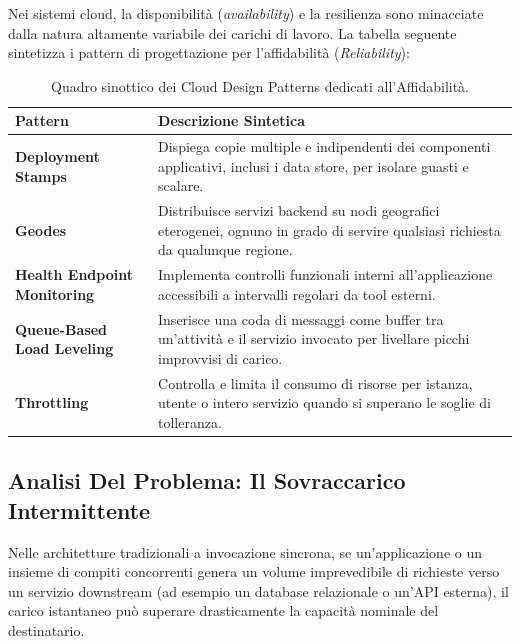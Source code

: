 \documentclass[11pt, a4paper]{article}
\begin{document}
Nei sistemi cloud, la disponibilità (\emph{availability}) e la resilienza sono minacciate dalla natura altamente variabile dei carichi di lavoro. La tabella seguente sintetizza i pattern di progettazione per l'affidabilità (\emph{Reliability}):

\begin{table}[H]
\centering
\small
\begin{tabularx}{\textwidth}{lX}
\toprule
\textbf{Pattern} & \textbf{Descrizione Sintetica} \\
\midrule
\textbf{Deployment Stamps} & Dispiega copie multiple e indipendenti dei componenti applicativi, inclusi i data store, per isolare guasti e scalare. \\
\textbf{Geodes} & Distribuisce servizi backend su nodi geografici eterogenei, ognuno in grado di servire qualsiasi richiesta da qualunque regione. \\
\textbf{Health Endpoint Monitoring} & Implementa controlli funzionali interni all'applicazione accessibili a intervalli regolari da tool esterni. \\
\textbf{Queue-Based Load Leveling} & Inserisce una coda di messaggi come buffer tra un'attività e il servizio invocato per livellare picchi improvvisi di carico. \\
\textbf{Throttling} & Controlla e limita il consumo di risorse per istanza, utente o intero servizio quando si superano le soglie di tolleranza. \\
\bottomrule
\end{tabularx}
\caption{Quadro sinottico dei Cloud Design Patterns dedicati all'Affidabilità.}
\label{tab:reliability_patterns}
\end{table}

\subsection{Analisi Del Problema: Il Sovraccarico Intermittente}

Nelle architetture tradizionali a invocazione sincrona, se un'applicazione o un insieme di compiti concorrenti genera un volume imprevedibile di richieste verso un servizio downstream (ad esempio un database relazionale o un'API esterna), il carico istantaneo può superare drasticamente la capacità nominale del destinatario.

\end{document}
